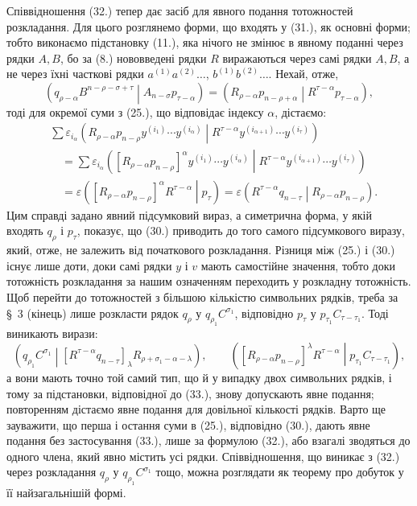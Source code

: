 \documentclass[11pt]{article}
\newcommand{\pair}[2]{\left(#1\middle|#2\right)}
\newcommand{\eps}{\varepsilon}
\begin{document}
Співвідношення (32.) тепер дає засіб для явного подання тотожностей розкладання. Для цього розглянемо форми, що входять у (31.), як основні форми; тобто виконаємо підстановку (11.), яка нічого не змінює в явному поданні через рядки $A,B$, бо за (8.) нововведені рядки $R$ виражаються через самі рядки $A,B$, а не через їхні часткові рядки $a^{(1)}a^{(2)}\ldots$, $b^{(1)}b^{(2)}\ldots$. Нехай, отже,
\begin{equation}
 \pair{q_{\rho-\alpha}B^{n-\rho-\sigma+\tau}}{A_{n-\sigma}p_{\tau-\alpha}}
 =\pair{R_{\rho-\alpha}p_{n-\rho+\alpha}}{R^{\tau-\alpha}p_{\tau-\alpha}},
\tag{33}
\end{equation}
тоді для окремої суми з (25.), що відповідає індексу $\alpha$, дістаємо:
\begin{equation}
\begin{aligned}
&\sum \eps_{i_\alpha}
\pair{R_{\rho-\alpha}p_{n-\rho}y^{(i_1)}\cdots y^{(i_\alpha)}}
{R^{\tau-\alpha}y^{(i_{\alpha+1})}\cdots y^{(i_\tau)}}\\
&\quad=\sum \eps_{i_\alpha}
\pair{[R_{\rho-\alpha}p_{n-\rho}]^\alpha
y^{(i_1)}\cdots y^{(i_\alpha)}}
{R^{\tau-\alpha}y^{(i_{\alpha+1})}\cdots y^{(i_\tau)}}\\
&\quad=\eps\pair{[R_{\rho-\alpha}p_{n-\rho}]^\alpha R^{\tau-\alpha}}{p_\tau}
 =\eps\pair{R^{\tau-\alpha}q_{n-\tau}}{R_{\rho-\alpha}p_{n-\rho}}.
\end{aligned}
\tag{34}
\end{equation}
Цим справді задано явний підсумковий вираз, а симетрична форма, у якій входять $q_\rho$ і $p_\tau$, показує, що (30.) приводить до того самого підсумкового виразу, який, отже, не залежить від початкового розкладання. Різниця між (25.) і (30.) існує лише доти, доки самі рядки $y$ і $v$ мають самостійне значення, тобто доки тотожність розкладання за нашим означенням переходить у розкладну тотожність. Щоб перейти до тотожностей з більшою кількістю символьних рядків, треба за \S\ 3 (кінець) лише розкласти рядок $q_\rho$ у $q_{\rho_1}C^{\sigma_1}$, відповідно $p_\tau$ у $p_{\tau_1}C_{\tau-\tau_1}$. Тоді виникають вирази:
\begin{equation}
 \pair{q_{\rho_1}C^{\sigma_1}}
 {[R^{\tau-\alpha}q_{n-\tau}]_\lambda R_{\rho+\sigma_1-\alpha-\lambda}},
 \qquad
 \pair{[R_{\rho-\alpha}p_{n-\rho}]^\lambda R^{\tau-\alpha}}
 {p_{\tau_1}C_{\tau-\tau_1}},
\tag{35}
\end{equation}
а вони мають точно той самий тип, що й у випадку двох символьних рядків, і тому за підстановки, відповідної до (33.), знову допускають явне подання; повторенням дістаємо явне подання для довільної кількості рядків. Варто ще зауважити, що перша і остання суми в (25.), відповідно (30.), дають явне подання без застосування (33.), лише за формулою (32.), або взагалі зводяться до одного члена, який явно містить усі рядки. Співвідношення, що виникає з (32.) через розкладання $q_\rho$ у $q_{\rho_1}C^{\sigma_1}$ тощо, можна розглядати як теорему про добуток у її найзагальнішій формі.
\end{document}
